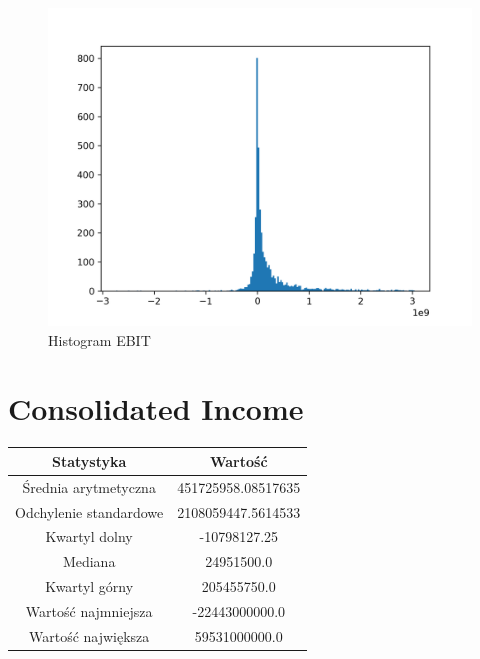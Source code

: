 \documentclass{article}
\begin{document}
\begin{figure}[h!]
    \includegraphics[width=\linewidth]{variables/EBIT.png}
    \caption{Histogram EBIT }
\end{figure}\section{ Consolidated Income }

\begin{center}
    \begin{tabular}{|c | c|} 
    \hline
    Statystyka & Wartość \\
    \hline\hline
    Średnia arytmetyczna & 451725958.08517635 \\ 
    \hline
    Odchylenie standardowe & 2108059447.5614533 \\
    \hline
    Kwartyl dolny & -10798127.25 \\
    \hline
    Mediana & 24951500.0 \\
    \hline
    Kwartyl górny & 205455750.0 \\
    \hline
    Wartość najmniejsza & -22443000000.0 \\
    \hline
    Wartość największa & 59531000000.0 \\
    \hline
   \end{tabular}
\end{center}
\end{document}
